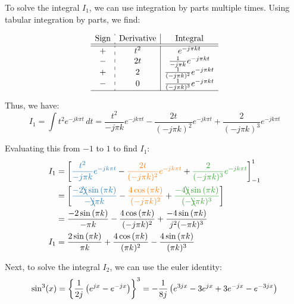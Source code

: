 \documentclass[a4paper, 10pt]{article}
\begin{document}
\begin{tosubmit}
To solve the integral \( I_1 \), we can use integration by parts multiple times.
Using tabular integration by parts, we find:

\renewcommand{\arraystretch}{1.7}
\[
\begin{array}{c:c|c}
    \text{Sign} & \text{Derivative} & \text{Integral} \\
    \hline
    \hline
    + & t^2 & e^{-j \pi k t} \\
    - & 2t & \frac{1}{-j \pi k} e^{-j \pi k t} \\
    + & 2 & \frac{1}{(-j \pi k)^2} e^{-j \pi k t} \\
    - & 0 & \frac{1}{(-j \pi k)^3} e^{-j \pi k t} \\
    \hline
\end{array}
\]

Thus, we have:
\[ I_1 = \int t^2 e^{-j k \pi t} \,dt = \frac{t^2}{-j \pi k} e^{-j k \pi t} - \frac{2t}{(-j \pi k)^2} e^{-j k \pi t} + \frac{2}{(-j \pi k)^3} e^{-j k \pi t} \]

Evaluating this from \( -1 \) to \( 1 \) to find \( I_1 \):
\begin{align*}
    I_1 &= \sqbracket{ \textcolor[HTML]{1F77B4}{ \frac{t^2}{-j \pi k} e^{-j k \pi t} } - \textcolor[HTML]{FF7F0E}{ \frac{2t}{(-j \pi k)^2} e^{-j k \pi t} } + \textcolor[HTML]{2CA02C}{ \frac{2}{(-j \pi k)^3} e^{-j k \pi t} } }_{-1}^{1} \\
    &= \sqbracket{ \textcolor[HTML]{1F77B4}{ \frac{-2 \bcancel{j} \sin{(\pi k)}}{-\bcancel{j} \pi k} } - \textcolor[HTML]{FF7F0E}{ \frac{4 \cos{(\pi k)}}{(-j \pi k)^2} } + \textcolor[HTML]{2CA02C}{ \frac{-4 \bcancel{j} \sin{(\pi k)}}{(-\bcancel{j} \pi k)^3} } } \\
    &= \frac{-2 \sin{(\pi k)}}{-\pi k} - \frac{4 \cos{(\pi k)}}{(-j \pi k)^2} + \frac{-4 \sin{(\pi k)}}{j^2 (-\pi k)^3} \\
    I_1 &= \frac{2 \sin{(\pi k)}}{\pi k} + \frac{4 \cos{(\pi k)}}{(\pi k)^2} - \frac {4 \sin{(\pi k)}}{(\pi k)^3}
\end{align*}

Next, to solve the integral \( I_2 \), we can use the euler identity:
\[ \sin^3(x) = \left\{ \frac{1}{2j} \left( e^{jx} - e^{-jx} \right) \right\}^3 = -\frac{1}{8j} \left( e^{3jx} - 3e^{jx} + 3e^{-jx} - e^{-3jx} \right) \]

\newpage


\end{tosubmit}
\end{document}
